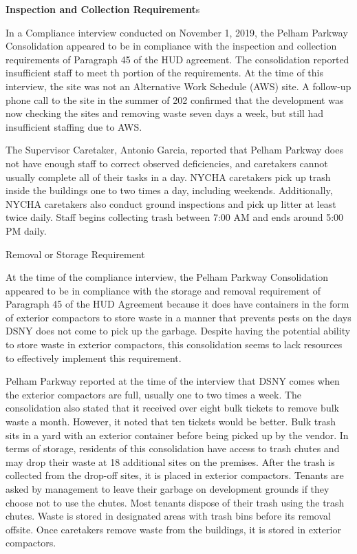 


\textbf{Inspection and Collection Requirement}s  

In a Compliance interview conducted on November 1, 2019, the Pelham Parkway Consolidation appeared to be in compliance with the inspection and collection requirements of Paragraph 45 of the HUD agreement. The consolidation reported insufficient staff to meet th portion of the requirements. At the time of this interview, the site was not an Alternative Work Schedule (AWS) site. A follow-up phone call to the site in the summer of 202 confirmed that the development was now checking the sites and removing waste seven days a week, but still had insufficient staffing due to AWS.



The Supervisor Caretaker, Antonio Garcia, reported that Pelham Parkway does not have enough staff to correct observed deficiencies, and caretakers cannot usually complete all of their tasks in a day. NYCHA caretakers pick up trash inside the buildings one to two times a day, including weekends. Additionally, NYCHA caretakers also conduct ground inspections and pick up litter at least twice daily. Staff begins collecting trash between 7:00 AM and ends around 5:00 PM daily.

 

Removal or Storage Requirement  

At the time of the compliance interview, the Pelham Parkway Consolidation appeared to be in compliance with the storage and removal requirement of Paragraph 45 of the HUD Agreement because it does have containers in the form of exterior compactors to store waste in a manner that prevents pests on the days DSNY does not come to pick up the garbage. Despite having the potential ability to store waste in exterior compactors, this consolidation seems to lack resources to effectively implement this requirement.

 

Pelham Parkway reported at the time of the interview that DSNY comes when the exterior compactors are full, usually one to two times a week. The consolidation also stated that it received over eight bulk tickets to remove bulk waste a month. However, it noted that ten tickets would be better. Bulk trash sits in a yard with an exterior container before being picked up by the vendor. In terms of storage, residents of this consolidation have access to trash chutes and may drop their waste at 18 additional sites on the premises. After the trash is collected from the drop-off sites, it is placed in exterior compactors. Tenants are asked by management to leave their garbage on development grounds if they choose not to use the chutes. Most tenants dispose of their trash using the trash chutes. Waste is stored in designated areas with trash bins before its removal offsite. Once caretakers remove waste from the buildings, it is stored in exterior compactors.

